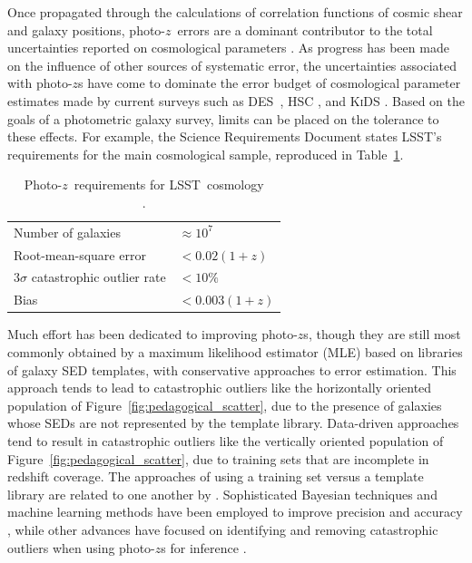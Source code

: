 \documentclass[iop]{emulateapj}
\newcommand{\Fig}[1]{Figure~\ref{#1}}
\newcommand{\project}[1]{\textsc{#1}}
\newcommand{\lsst}{\project{LSST}}
\newcommand{\des}{\project{DES}}
\newcommand{\pz}{photo-$z$}
\newcommand{\Pz}{Photo-$z$}
\begin{document}
Once propagated through the calculations of correlation functions of cosmic shear and galaxy positions, \pz\ errors are a dominant contributor to the total uncertainties reported on cosmological parameters \citep{abruzzo_impact_2019}.
As progress has been made on the influence of other sources of systematic error, the uncertainties associated with \pz s have come to dominate the error budget of cosmological parameter estimates made by current surveys such as \des\ \citep{hoyle_dark_2017}, \project{HSC} \citep{tanaka_photometric_2018}, and \project{KiDS} \citep{hildebrandt_kids-450:_2017}.
Based on the goals of a photometric galaxy survey, limits can be placed on the tolerance to these effects.
For example, the Science Requirements Document \citep{mandelbaum_weak_2017} states \lsst's requirements for the main cosmological sample, reproduced in Table~\ref{tab:lsstsrd}.

\begin{table}
	\begin{center}
		\caption{\Pz\ requirements for \lsst\ cosmology\\
				\citep{mandelbaum_weak_2017}.}
		\begin{tabular}{ll}
			Number of galaxies & $\approx 10^{7}$\\
			Root-mean-square error & $< 0.02 (1 + z)$\\
			$3 \sigma$ catastrophic outlier rate & $< 10\%$\\
			Bias & $< 0.003 (1 + z)$\\
		\end{tabular}
		\label{tab:lsstsrd}
	\end{center}
\end{table}

Much effort has been dedicated to improving \pz s, though they are still most commonly obtained by a maximum likelihood estimator (MLE) based on libraries of galaxy SED templates, with conservative approaches to error estimation.
This approach tends to lead to catastrophic outliers like the horizontally oriented population of \Fig{fig:pedagogical_scatter}, due to the presence of galaxies whose SEDs are not represented by the template library.
Data-driven approaches tend to result in catastrophic outliers like the vertically oriented population of \Fig{fig:pedagogical_scatter}, due to training sets that are incomplete in redshift coverage.
The approaches of using a training set versus a template library are related to one another by \citet{budavari_unified_2009}.
Sophisticated Bayesian techniques and machine learning methods have been employed to improve precision \citep{carliles_random_2010} and accuracy \citep{sadeh_annz2:_2016}, while other advances have focused on identifying and removing catastrophic outliers when using \pz s for inference \citep{gorecki_new_2014}. 
\end{document}
